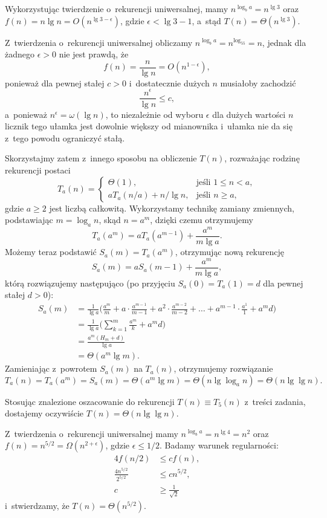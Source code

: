 
\subproblem %
Wykorzystując twierdzenie o~rekurencji uniwersalnej, mamy $n^{\log_ba}=n^{\lg3}$ oraz $f(n)=n\lg n=O(n^{\lg3-\epsilon})$, gdzie $\epsilon<\lg3-1$, a~stąd $T(n)=\Theta(n^{\lg3})$.

\subproblem %
Z~twierdzenia o~rekurencji uniwersalnej obliczamy $n^{\log_ba}=n^{\log_55}=n$, jednak dla żadnego $\epsilon>0$ nie jest prawdą, że
\[
	f(n) = \frac{n}{\lg n} = O(n^{1-\epsilon}),
\]
ponieważ dla pewnej stałej $c>0$ i~dostatecznie dużych $n$ musiałoby zachodzić
\[
	\frac{n^\epsilon}{\lg n} \le c,
\]
a~ponieważ $n^\epsilon=\omega(\lg n)$, to niezależnie od wyboru $\epsilon$ dla dużych wartości $n$ licznik tego ułamka jest dowolnie większy od mianownika i~ułamka nie da się z~tego powodu ograniczyć stałą.

Skorzystajmy zatem z~innego sposobu na obliczenie $T(n)$, rozważając rodzinę rekurencji postaci
\[
	T_a(n) = \begin{cases}
		\Theta(1), & \text{jeśli $1\le n<a$}, \\
		aT_a(n/a)+n/\!\lg n, & \text{jeśli $n\ge a$},
	\end{cases}
\]
gdzie $a\ge2$ jest liczbą całkowitą.
Wykorzystamy technikę zamiany zmiennych, podstawiając $m=\log_an$, skąd $n=a^m$, dzięki czemu otrzymujemy
\[
	T_a(a^m) = aT_a(a^{m-1})+\frac{a^m}{m\lg a}.
\]
Możemy teraz podstawić $S_a(m)=T_a(a^m)$, otrzymując nową rekurencję
\[
	S_a(m) = aS_a(m-1)+\frac{a^m}{m\lg a},
\]
którą rozwiązujemy następująco (po przyjęciu $S_a(0)=T_a(1)=d$ dla pewnej stałej $d>0$):
\begin{align*}
	S_a(m) &= \frac{1}{\lg a}\biggl(\frac{a^m}{m}+a\cdot\frac{a^{m-1}}{m-1}+a^2\cdot\frac{a^{m-2}}{m-2}+\dots+a^{m-1}\cdot\frac{a^1}{1}+a^md\biggr) \\[1mm]
	&= \frac{1}{\lg a}\biggl(\sum_{k=1}^m\frac{a^m}{k}+a^md\biggr) \\[1mm]
	&= \frac{a^m(H_m+d)}{\lg a} \\[1mm]
	&= \Theta(a^m\lg m).
\end{align*}
Zamieniając z~powrotem $S_a(m)$ na $T_a(n)$, otrzymujemy rozwiązanie
\[
	T_a(n) = T_a(a^m) = S_a(m) = \Theta(a^m\lg m) = \Theta(n\lg\log_a n) = \Theta(n\lg\lg n).
\]

Stosując znalezione oszacowanie do rekurencji $T(n)\equiv T_5(n)$ z~treści zadania, dostajemy oczywiście $T(n)=\Theta(n\lg\lg n)$.

\subproblem %
Z~twierdzenia o~rekurencji uniwersalnej mamy $n^{\log_ba}=n^{\lg4}=n^2$ oraz $f(n)=n^{5/2}=\Omega(n^{2+\epsilon})$, gdzie $\epsilon\le1/2$.
Badamy warunek regularności:
\begin{align*}
	4f(n/2) &\le cf(n), \\
	\frac{4n^{5/2}}{2^{5/2}} &\le cn^{5/2}, \\
	c &\ge \frac{1}{\sqrt{2}}
\end{align*}
i~stwierdzamy, że $T(n)=\Theta(n^{5/2})$.

